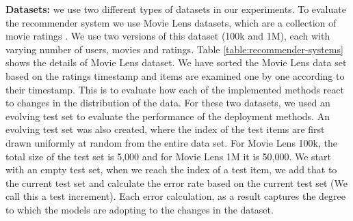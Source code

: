 \documentclass{vldb}
\begin{document}
\textbf{Datasets:} we use two different types of datasets in our experiments.
To evaluate the recommender system we use Movie Lens datasets, which are a collection of movie ratings \cite{harper2016movielens} .
We use two versions of this dataset (100k and 1M), each with varying number of users, movies and ratings.
Table \ref{table:recommender-systems} shows the details of Movie Lens dataset.
We have sorted the Movie Lens data set based on the ratings timestamp and items are examined one by one according to their timestamp.
This is to evaluate how each of the implemented methods react to changes in the distribution of the data.
For these two datasets, we used an evolving test set to evaluate the performance of the deployment methods.
An evolving test set was also created, where the index of the test items are first drawn uniformly at random from the entire data set.
For Movie Lens 100k, the total size of the test set is 5,000 and for Movie Lens 1M it is 50,000. 
We start with an empty test set, when we reach the index of a test item, we add that to the current test set and calculate the error rate based on the current test set (We call this a test increment).
Each error calculation, as a result captures the degree to which the models are adopting to the changes in the dataset.
\end{document}
